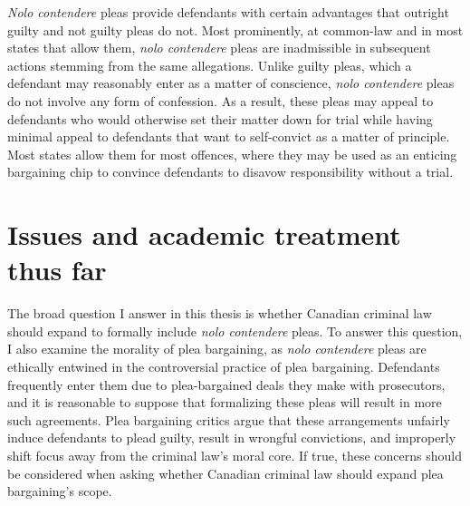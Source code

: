 \textit{Nolo contendere} pleas provide defendants with certain advantages that outright guilty and not guilty pleas do not. Most prominently, at common-law and in most states that allow them, \textit{nolo contendere} pleas are inadmissible in subsequent actions stemming from the same allegations. Unlike guilty pleas, which a defendant may reasonably enter as a matter of conscience, \textit{nolo contendere} pleas do not involve any form of confession. As a result, these pleas may appeal to defendants who would otherwise set their matter down for trial while having minimal appeal to defendants that want to self-convict as a matter of principle. Most states allow them for most offences, where they may be used as an enticing bargaining chip to convince defendants to disavow responsibility without a trial.

\section{Issues and academic treatment thus far}

The broad question I answer in this thesis is whether Canadian criminal law should expand to formally include \textit{nolo contendere} pleas. To answer this question, I also examine the morality of plea bargaining, as \textit{nolo contendere} pleas are ethically entwined in the controversial practice of plea bargaining. Defendants frequently enter them due to plea-bargained deals they make with prosecutors, and it is reasonable to suppose that formalizing these pleas will result in more such agreements. Plea bargaining critics argue that these arrangements unfairly induce defendants to plead guilty, result in wrongful convictions, and improperly shift focus away from the criminal law's moral core. If true, these concerns should be considered when asking whether Canadian criminal law should expand plea bargaining's scope.

